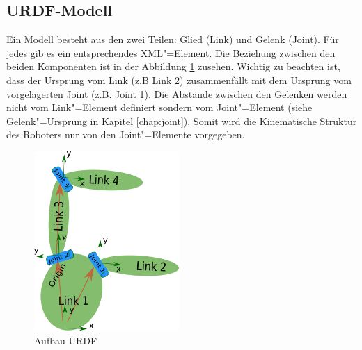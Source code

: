 \subsection{URDF-Modell}
\label{urdf-modell}
Ein Modell besteht aus den zwei Teilen: Glied (Link) und Gelenk (Joint).
Für jedes gib es ein entsprechendes XML"=Element.
Die Beziehung zwischen den beiden Komponenten ist in der Abbildung \ref{Ab:aufbaut-urdf} zusehen.
Wichtig zu beachten ist, dass der Ursprung vom Link (z.B Link 2) zusammenfällt mit dem Ursprung vom vorgelagerten Joint (z.B. Joint 1).
Die Abstände zwischen den Gelenken werden nicht vom Link"=Element definiert sondern vom Joint"=Element (siehe Gelenk"=Ursprung in Kapitel \ref{chap:joint}).
Somit wird die Kinematische Struktur des Roboters nur von den  Joint"=Elemente vorgegeben.

\begin{figure}[ht!]
	\centering
	\includegraphics[width=5.5cm]{images/urdf_model.png}
	\caption{Aufbau URDF \cite{ros}}
	\label{Ab:aufbaut-urdf}
\end{figure}



